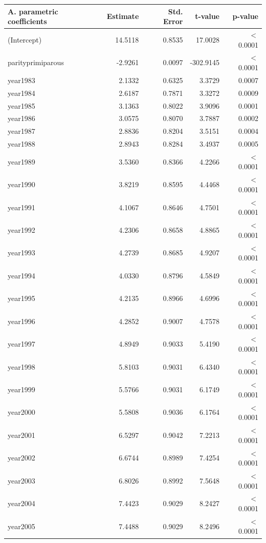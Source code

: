     \begin{table}[H]
    \centering
    \begin{tabular}{lrrrr}
    \textbf{A. parametric coefficients} & Estimate & Std. Error & t-value & p-value \\ 
       \hline
       \hline
      (Intercept) & 14.5118 & 0.8535 & 17.0028 & $<$ 0.0001 \\ 
  parityprimiparous & -2.9261 & 0.0097 & -302.9145 & $<$ 0.0001 \\ 
  year1983 & 2.1332 & 0.6325 & 3.3729 & 0.0007 \\ 
  year1984 & 2.6187 & 0.7871 & 3.3272 & 0.0009 \\ 
  year1985 & 3.1363 & 0.8022 & 3.9096 & 0.0001 \\ 
  year1986 & 3.0575 & 0.8070 & 3.7887 & 0.0002 \\ 
  year1987 & 2.8836 & 0.8204 & 3.5151 & 0.0004 \\ 
  year1988 & 2.8943 & 0.8284 & 3.4937 & 0.0005 \\ 
  year1989 & 3.5360 & 0.8366 & 4.2266 & $<$ 0.0001 \\ 
  year1990 & 3.8219 & 0.8595 & 4.4468 & $<$ 0.0001 \\ 
  year1991 & 4.1067 & 0.8646 & 4.7501 & $<$ 0.0001 \\ 
  year1992 & 4.2306 & 0.8658 & 4.8865 & $<$ 0.0001 \\ 
  year1993 & 4.2739 & 0.8685 & 4.9207 & $<$ 0.0001 \\ 
  year1994 & 4.0330 & 0.8796 & 4.5849 & $<$ 0.0001 \\ 
  year1995 & 4.2135 & 0.8966 & 4.6996 & $<$ 0.0001 \\ 
  year1996 & 4.2852 & 0.9007 & 4.7578 & $<$ 0.0001 \\ 
  year1997 & 4.8949 & 0.9033 & 5.4190 & $<$ 0.0001 \\ 
  year1998 & 5.8103 & 0.9031 & 6.4340 & $<$ 0.0001 \\ 
  year1999 & 5.5766 & 0.9031 & 6.1749 & $<$ 0.0001 \\ 
  year2000 & 5.5808 & 0.9036 & 6.1764 & $<$ 0.0001 \\ 
  year2001 & 6.5297 & 0.9042 & 7.2213 & $<$ 0.0001 \\ 
  year2002 & 6.6744 & 0.8989 & 7.4254 & $<$ 0.0001 \\ 
  year2003 & 6.8026 & 0.8992 & 7.5648 & $<$ 0.0001 \\ 
  year2004 & 7.4423 & 0.9029 & 8.2427 & $<$ 0.0001 \\ 
  year2005 & 7.4488 & 0.9029 & 8.2496 & $<$ 0.0001 \\ 

\end{tabular}
\end{table}
